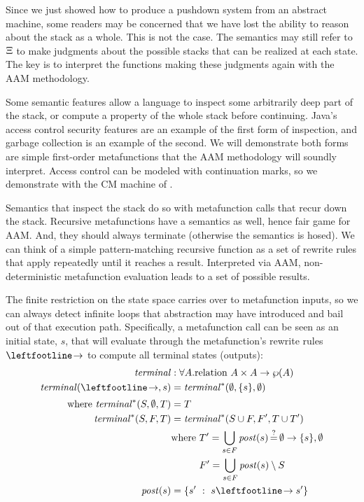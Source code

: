 Since we just showed how to produce a pushdown system from an abstract machine, some readers may be concerned that we have lost the ability to reason about the stack as a whole.
%
This is not the case.
%
The semantics may still refer to $\Xi$ to make judgments about the possible stacks that can be realized at each state.
%
The key is to interpret the functions making these judgments again with the AAM methodology.

%
Some semantic features allow a language to inspect some arbitrarily deep part of the stack, or compute a property of the whole stack before continuing.
%
Java's access control security features are an example of the first form of inspection, and garbage collection is an example of the second.
%
We will demonstrate both forms are simple first-order metafunctions that the AAM methodology will soundly interpret.
%
Access control can be modeled with continuation marks, so we demonstrate with the CM machine of \citeauthor{dvanhorn:Clements2004Tailrecursive}.

Semantics that inspect the stack do so with metafunction calls that recur down the stack.
%
Recursive metafunctions have a semantics as well, hence fair game for AAM.
%
And, they should always terminate (otherwise the semantics is hosed).
%
We can think of a simple pattern-matching recursive function as a set of rewrite rules that apply repeatedly until it reaches a result.
%
Interpreted via AAM, non-deterministic metafunction evaluation leads to a set of possible results.
%

The finite restriction on the state space carries over to metafunction inputs, so we can always detect infinite loops that abstraction may have introduced and bail out of that execution path.
%
Specifically, a metafunction call can be seen as an initial state, $s$, that will evaluate through the metafunction's rewrite rules $\stepto$ to compute all terminal states (outputs):
\begin{align*}
  \terminal &: \forall A. \text{relation } A \times A \to \wp(A) \\
  \terminal(\stepto,s) &= \terminalaux(\emptyset,\set{s},\emptyset) \\[2pt]
  \text{where } \terminalaux(S, \emptyset, T) &= T \\
   \terminalaux(S, F, T) &= \terminalaux(S\cup F, F', T\cup T') \\
   & \text{where } T' = \bigcup\limits_{s \in F}{\post(s) \deceq\emptyset \to \set{s},\emptyset} \\
             &\phantom{\text{where }} F' = \bigcup\limits_{s\in F}{\post(s)} \setminus S \\
                   \post(s) &= \setbuild{s'}{s \stepto s'}
\end{align*}

